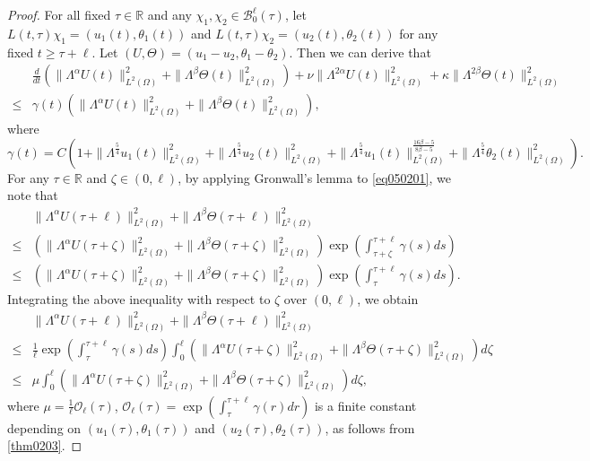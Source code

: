 \documentclass[oneside,preprint,12pt,numbers,sort&compress]{elsarticle}
\begin{document}
\begin{proof}
For all fixed $\tau \in \mathbb{R}$ and any $\chi_{1}, \chi_{2} \in \mathcal{B}_{0}^{\ell}(\tau)$, let $L(t, \tau)\chi_1 = (u_1(t), \theta_1(t))$ and $L(t, \tau)\chi_2 = (u_2(t), \theta_2(t))$ for any fixed $t \geq \tau + \ell$. Let $(U, \Theta) = (u_1 - u_2, \theta_1 - \theta_2)$. Then we can derive that
\begin{equation}\label{eq050201}
\begin{aligned}
& \frac{d}{dt}
\left( 
\| \Lambda^{\alpha}U(t) \|_{L^2(\Omega)}^{2} + \| \Lambda^{\beta}\Theta (t) \|_{L^2(\Omega)}^{2} 
\right)
+\nu \| \Lambda^{2\alpha}U(t) \|_{L^2(\Omega)}^{2} 
+\kappa \| \Lambda^{2\beta}\Theta(t) \|_{L^2(\Omega)}^{2} 
\\
\leq
& 
\gamma(t)
\left( 
\| \Lambda^{\alpha}U(t) \|_{L^2(\Omega)}^{2} + \| \Lambda^{\beta}\Theta (t) \|_{L^2(\Omega)}^{2}
\right),
\end{aligned}
\end{equation}
where
$$
\gamma(t)=
C \left( 1+
\| \Lambda^{\frac{5}{4}}u_1 (t) \|_{L^2(\Omega)}^{2} 
+\| \Lambda^{\frac{5}{4}}u_2 (t) \|_{L^2(\Omega)}^{2} 
+ \| \Lambda^{\frac{5}{4}} u_1 (t) \|_{L^2(\Omega)}^{\frac{16\beta-5}{8\beta-5}}
+ \| \Lambda^{\frac{5}{4}}\theta_2 (t) \|_{L^2(\Omega)}^{2} 
\right).
$$
For any $\tau \in \mathbb{R}$ and $\zeta\in(0,\ell)$, by applying Gronwall’s lemma to \cref{eq050201}, we note that
\begin{align*}
&\| \Lambda^{\alpha}U(\tau+\ell) \|_{L^2(\Omega)}^{2} 
+ \| \Lambda^{\beta}\Theta (\tau+\ell) \|_{L^2(\Omega)}^{2} \\
\leq&
\left( \| \Lambda^{\alpha}U(\tau+\zeta) \|_{L^2(\Omega)}^{2} 
+ \| \Lambda^{\beta}\Theta (\tau+\zeta) \|_{L^2(\Omega)}^{2} \right)
\exp \left(\int_{\tau+\zeta}^{\tau+\ell}
\gamma(s) ds \right)\\
\leq&
\left( \| \Lambda^{\alpha}U(\tau+\zeta) \|_{L^2(\Omega)}^{2} 
+ \| \Lambda^{\beta}\Theta (\tau+\zeta) \|_{L^2(\Omega)}^{2} \right)
\exp \left(\int_{\tau}^{\tau+\ell}
\gamma(s) ds \right).
\end{align*}
Integrating the above inequality with respect to $\zeta$ over $(0,\ell)$, we obtain
\begin{equation}\label{eq050202}
\begin{aligned}
&\| \Lambda^{\alpha}U(\tau+\ell) \|_{L^2(\Omega)}^{2} 
+ \| \Lambda^{\beta}\Theta (\tau+\ell) \|_{L^2(\Omega)}^{2} \\
\leq& \frac{1}{\ell}
\exp \left(\int_{\tau}^{\tau+\ell}
\gamma(s) ds \right)\int_{0}^{\ell}\left( \| \Lambda^{\alpha}U(\tau+\zeta) \|_{L^2(\Omega)}^{2} 
+ \| \Lambda^{\beta}\Theta (\tau+\zeta) \|_{L^2(\Omega)}^{2} \right)d\zeta
\\
\leq& \mu
\int_{0}^{\ell}\left(\| \Lambda^{\alpha}U(\tau+\zeta) \|_{L^2(\Omega)}^{2} 
+ \| \Lambda^{\beta}\Theta (\tau+\zeta) \|_{L^2(\Omega)}^{2} \right)d\zeta,
\end{aligned}
\end{equation}
where $\mu=\frac{1}{\ell}\mathcal{O}_{\ell}(\tau)$, $\mathcal{O}_{\ell}(\tau) = \exp \left(\int_{\tau}^{\tau+\ell}
\gamma(r) dr \right)$ is a finite constant depending on $(u_1(\tau), \theta_1(\tau))$ and $(u_2(\tau), \theta_2(\tau))$, as follows from \cref{thm0203}. 


\end{proof}
\end{document}
